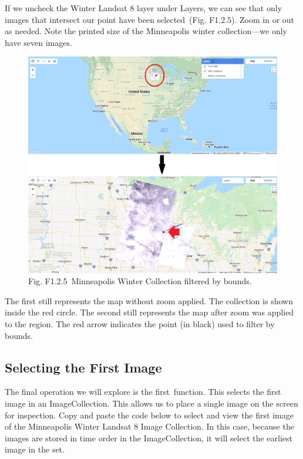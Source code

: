 \documentclass[
  letterpaper,
  DIV=11,
  numbers=noendperiod]{scrreprt}
\begin{document}
If we uncheck the Winter Landsat 8 layer under Layers, we can see that
only images that intersect our point have been selected~(Fig. F1.2.5).
Zoom in or out as needed. Note the printed size of the Minneapolis
winter collection---we only have seven images.

\begin{figure}

{\centering \includegraphics{./F1/image62.png}

}

\caption{Fig. F1.2.5~Minneapolis Winter Collection filtered by bounds.}

\end{figure}

The first still represents the map without zoom applied. The collection
is shown inside the red circle. The second still represents the map
after zoom was applied to the region. The red arrow indicates the point
(in black) used to filter by bounds.

\hypertarget{selecting-the-first-image}{%
\subsection{Selecting the First Image}\label{selecting-the-first-image}}

The final operation we will explore is the first~function. This selects
the first image in an ImageCollection. This allows us to place a single
image on the screen for inspection. Copy and paste the code below to
select and view the first image of the Minneapolis Winter Landsat 8
Image Collection. In this case, because the images are stored in time
order in the ImageCollection, it will select the earliest image in the
set.
\end{document}
